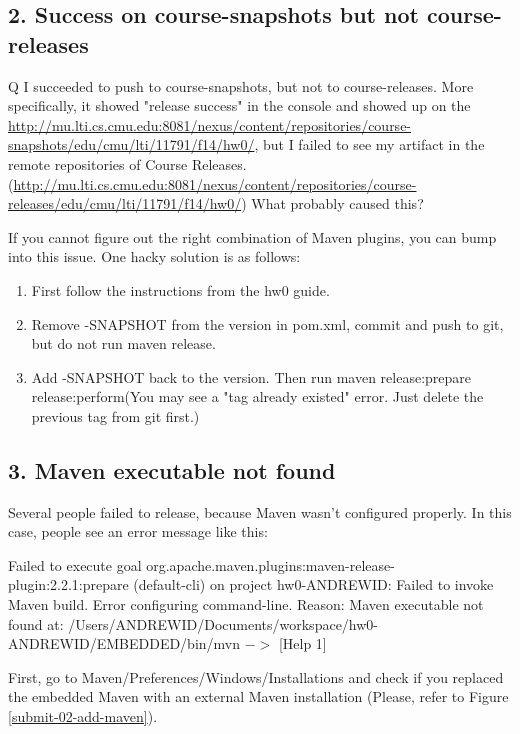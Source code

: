 \subsection{2. Success on course-snapshots but not course-releases}

\begin{qa}
\item[Q] I succeeded to push to course-snapshots, but not to course-releases. 
More specifically, it showed "release success" in the console and showed up on the \url{http://mu.lti.cs.cmu.edu:8081/nexus/content/repositories/course-snapshots/edu/cmu/lti/11791/f14/hw0/}, but I failed to see my artifact in the remote repositories of Course Releases. (\url{http://mu.lti.cs.cmu.edu:8081/nexus/content/repositories/course-releases/edu/cmu/lti/11791/f14/hw0/})  What probably caused this?
\end{qa}

If you cannot figure out the right combination of Maven plugins, you can bump into this issue.
One hacky solution is as follows:
\begin{enumerate}
\item First follow the instructions from the hw0 guide.
\item Remove -SNAPSHOT from the version in pom.xml, commit and push to git, but do not run maven release.
\item Add -SNAPSHOT back to the version. Then run maven release:prepare release:perform(You may see a "tag already existed" error. Just delete the previous tag from git first.)
\end{enumerate}

\subsection{3. Maven executable not found}
Several people failed to release, because Maven wasn't configured properly.
In this case, people see an error message like this:
\begin{qa}
\item[]
[ERROR] Failed to execute goal org.apache.maven.plugins:maven-release-plugin:2.2.1:prepare (default-cli) on project hw0-ANDREWID: Failed to invoke Maven build. Error configuring command-line. Reason: Maven executable not found at: /Users/ANDREWID/Documents/workspace/hw0-ANDREWID/EMBEDDED/bin/mvn $->$ [Help 1]
\end{qa}

First, go to Maven/Preferences/Windows/Installations and check if you replaced the embedded Maven with
an external Maven installation (Please, refer to Figure \ref{submit-02-add-maven}).

